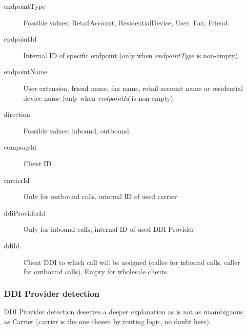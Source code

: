 \documentclass[letterpaper,10pt,spanish]{sphinxmanual}
\begin{document}
\begin{description}
\item[{endpointType}] \leavevmode{}\label{administration_portal/brand/calls/call_csv_schedulers:term-endpointtype}
Possible values: RetailAccount, ResidentialDevice, User, Fax, Friend.

\item[{endpointId}] \leavevmode{}\label{administration_portal/brand/calls/call_csv_schedulers:term-endpointid}
Internal ID of specific endpoint (only when \emph{endpointType} is non-empty).

\item[{endpointName}] \leavevmode{}\label{administration_portal/brand/calls/call_csv_schedulers:term-endpointname}
User extension, friend name, fax name, retail account name or residential device name (only when \emph{endpointId} is non-empty).

\item[{direction}] \leavevmode{}\label{administration_portal/brand/calls/call_csv_schedulers:term-27}
Possible values: inbound, outbound.

\item[{companyId}] \leavevmode{}\label{administration_portal/brand/calls/call_csv_schedulers:term-companyid}
Client ID

\item[{carrierId}] \leavevmode{}\label{administration_portal/brand/calls/call_csv_schedulers:term-carrierid}
Only for outbound calls, internal ID of used carrier

\item[{ddiProviderId}] \leavevmode{}\label{administration_portal/brand/calls/call_csv_schedulers:term-ddiproviderid}
Only for inbound calls, internal ID of used DDI Provider

\item[{ddiId}] \leavevmode{}\label{administration_portal/brand/calls/call_csv_schedulers:term-ddiid}
Client DDI to which call will be assigned (callee for inbound calls, caller for outbound calls). Empty for
wholesale clients.

\end{description}


\subsubsection{DDI Provider detection}
\label{administration_portal/brand/calls/call_csv_schedulers:ddi-provider-detection}
DDI Provider detection deserves a deeper explanation as is not as unambiguous as Carrier (carrier is the one chosen by
routing logic, no doubt here).
\end{document}
